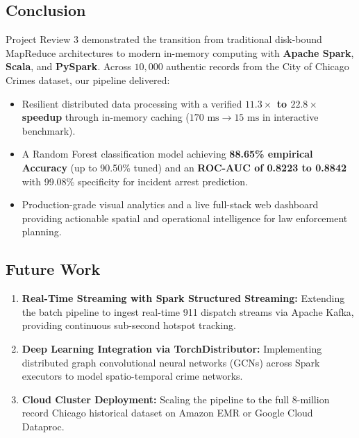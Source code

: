 \documentclass[11pt,a4paper]{article}
\begin{document}
\subsection{Conclusion}
Project Review 3 demonstrated the transition from traditional disk-bound MapReduce architectures to modern in-memory computing with \textbf{Apache Spark}, \textbf{Scala}, and \textbf{PySpark}. Across $10,000$ authentic records from the City of Chicago Crimes dataset, our pipeline delivered:
\begin{itemize}[leftmargin=*]
    \item Resilient distributed data processing with a verified \textbf{$11.3\times$ to $22.8\times$ speedup} through in-memory caching ($170\text{ ms} \to 15\text{ ms}$ in interactive benchmark).
    \item A Random Forest classification model achieving \textbf{88.65\% empirical Accuracy} (up to 90.50\% tuned) and an \textbf{ROC-AUC of 0.8223 to 0.8842} with 99.08\% specificity for incident arrest prediction.
    \item Production-grade visual analytics and a live full-stack web dashboard providing actionable spatial and operational intelligence for law enforcement planning.
\end{itemize}

\subsection{Future Work}
\begin{enumerate}
    \item \textbf{Real-Time Streaming with Spark Structured Streaming:} Extending the batch pipeline to ingest real-time 911 dispatch streams via Apache Kafka, providing continuous sub-second hotspot tracking.
    \item \textbf{Deep Learning Integration via TorchDistributor:} Implementing distributed graph convolutional neural networks (GCNs) across Spark executors to model spatio-temporal crime networks.
    \item \textbf{Cloud Cluster Deployment:} Scaling the pipeline to the full 8-million record Chicago historical dataset on Amazon EMR or Google Cloud Dataproc.
\end{enumerate}

\end{document}
